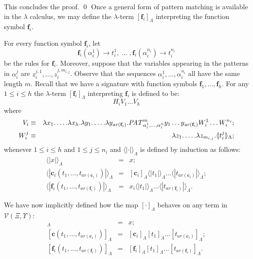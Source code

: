 \documentclass{LMCS}
\newcommand{\funone}{\mathbf{f}}
\newcommand{\conone}{\mathbf{c}}
\newcommand{\seqpone}{\alpha}
\newcommand{\varone}{x}
\newcommand{\varthree}{z}
\newcommand{\valueone}{V}
\newcommand{\valuetwo}{W}
\newcommand{\termone}{t}
\newcommand{\TRSonetolambdaII}[1]{[#1]_{\Lambdaterms}}
\newcommand{\TRSonetolambdaIII}[1]{\langle\!|#1|\!\rangle_{\Lambdaterms}}
\newcommand{\arity}[1]{\mathit{ar}(#1)}
\newcommand{\Variables}{\Upsilon}
\newcommand{\Lambdaterms}{\Lambda}
\newcommand{\TRSone}{\Xi}
\newcommand{\TRSvartermsp}[1]{\mathcal{V}(#1,\Variables)}
\newcommand{\rewrTRS}{\rightarrow}
\begin{document}
This concludes the proof.
\qed
Once a general form of pattern matching is available in the $\lambda$ calculus, we may define
the $\lambda$-term $\TRSonetolambdaII{\funone_i}$ interpreting the function symbol $\funone_i$.
\begin{defi}\label{Def-TRSonetolambdaII-fun}
For every function symbol $\funone_i$, let
$$
\funone_i(\seqpone_i^1)\rewrTRS\termone_i^1,\;\ldots\;,
\funone_i(\seqpone_i^{n_i})\rewrTRS\termone_i^{n_i}
$$
be the rules for $\funone_i$. Moreover, suppose that
the variables appearing in the patterns in $\seqpone_i^j$ are
$z_i^{j,1},\ldots,z_i^{j,m_{i,j}}$. Observe that the
sequences $\seqpone_i^1,\ldots,\seqpone_i^{n_i}$ all have
the same length $m$. Recall that we have a signature with function symbols $\funone_1,\ldots,\funone_h$. For any $1\leq i \leq h$ 
the $\lambda$-term $\TRSonetolambdaII{\funone_i}$
interpreting $\funone_i$ is defined to be:
$$
H_i\valueone_1\ldots\valueone_h
$$
where
\begin{eqnarray*}
\valueone_i&\equiv&\lambda x_1.\ldots.\lambda x_h.\lambda y_1.\ldots.\lambda y_{\arity{\funone_i}}.
\patlambda^m_{\seqpone_i^1,\ldots,\seqpone_i^n}y_1\ldots y_{\arity{\funone_i}}\valuetwo_i^1\ldots\valuetwo_i^{n_i};\\
\valuetwo_i^j&\equiv&\lambda\varthree_1.\ldots.\lambda\varthree_{m_{i,j}}.\TRSonetolambdaIII{\termone_i^j};
\end{eqnarray*}
whenever $1\leq i\leq h$ and $1\leq j\leq n_i$ and
$\TRSonetolambdaIII{\cdot}$ is defined by induction as follows:
\begin{eqnarray*}
\TRSonetolambdaIII{\varone}&=&\varone;\\
\TRSonetolambdaIII{\conone_i(\termone_1,\ldots,\termone_{\arity{\conone_i}})}&=&\TRSonetolambdaII{\conone_i}
  \TRSonetolambdaIII{\termone_1}\ldots\TRSonetolambdaIII{\termone_{\arity{\conone_i}}};\\
\TRSonetolambdaIII{\funone_i(\termone_1,\ldots,\termone_{\arity{\funone_i}})}&=&\varone_i
  \TRSonetolambdaIII{\termone_1}\ldots\TRSonetolambdaIII{\termone_{\arity{\funone_i}}}.
\end{eqnarray*}
\end{defi}
We have now implicitly defined how the map $\TRSonetolambdaII{\cdot}$ behaves on
any term in $\TRSvartermsp{\TRSone}$:
\begin{eqnarray*}
\TRSonetolambdaII{\varone}&=&\varone;\\
\TRSonetolambdaII{\conone(\termone_1,\ldots,\termone_{\arity{\conone_i}})}&=&\TRSonetolambdaII{\conone_i}
  \TRSonetolambdaII{\termone_1}\ldots\TRSonetolambdaII{\termone_{\arity{\conone_i}}};\\
\TRSonetolambdaII{\funone_i(\termone_1,\ldots,\termone_{\arity{\funone_i}})}&=&\TRSonetolambdaII{\funone_i}
  \TRSonetolambdaII{\termone_1}\ldots\TRSonetolambdaII{\termone_{\arity{\funone_i}}}.
\end{eqnarray*}
\end{document}
